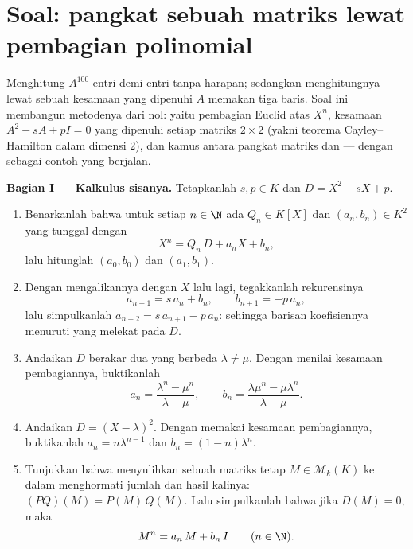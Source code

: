 \section{Soal: pangkat sebuah matriks lewat pembagian polinomial}

\begin{problem}\label{pb:b1:matrices:1}
Menghitung $A^{100}$ entri demi entri tanpa harapan; sedangkan menghitungnya
lewat sebuah kesamaan  yang dipenuhi $A$ memakan tiga baris.
Soal ini membangun metodenya dari nol: yaitu pembagian Euclid
atas $X^n$, kesamaan $A^2 - sA + pI = 0$ yang dipenuhi setiap matriks $2
\times 2$ (yakni teorema Cayley--Hamilton dalam dimensi
$2$), dan kamus antara pangkat matriks dan  --- dengan  sebagai contoh yang berjalan.

\medskip
\noindent\textbf{Bagian I --- Kalkulus sisanya.} Tetapkanlah $s, p
\in K$ dan $D = X^2 - sX + p$.
\begin{enumerate}
  \item Benarkanlah bahwa untuk setiap $n \in \N$ ada $Q_n
        \in K[X]$ dan $(a_n, b_n) \in K^2$ yang tunggal dengan
        \[
        X^n = Q_n\,D + a_n X + b_n ,
        \]
        lalu hitunglah $(a_0, b_0)$ dan $(a_1, b_1)$.
  \item Dengan mengalikannya dengan $X$ lalu  lagi, tegakkanlah
        rekurensinya
        \[
        a_{n+1} = s\,a_n + b_n,
        \qquad
        b_{n+1} = -p\,a_n ,
        \]
        lalu simpulkanlah $a_{n+2} = s\,a_{n+1} - p\,a_n$: sehingga
        barisan koefisiennya menuruti  yang melekat
        pada $D$.
  \item Andaikan $D$ berakar dua yang berbeda $\lambda \neq \mu$.
        Dengan menilai kesamaan pembagiannya, buktikanlah
        \[
        a_n = \frac{\lambda^n - \mu^n}{\lambda - \mu},
        \qquad
        b_n = \frac{\lambda\mu^n - \mu\lambda^n}{\lambda - \mu} .
        \]
  \item Andaikan $D = (X - \lambda)^2$. Dengan memakai 
        kesamaan pembagiannya, buktikanlah $a_n = n\lambda^{n-1}$ dan
        $b_n = (1 - n)\lambda^{n}$.
  \item Tunjukkan bahwa menyulihkan sebuah matriks tetap $M \in
        \mathcal{M}_k(K)$ ke dalam  menghormati jumlah dan
        hasil kalinya: $(PQ)(M) = P(M)\,Q(M)$. Lalu simpulkanlah bahwa jika $D(M) =
        0$, maka
        \[
        M^n = a_n\,M + b_n\,I \qquad (n \in \N).
        \]
\end{enumerate}


\end{problem}
